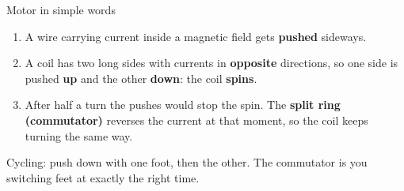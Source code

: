 \documentclass[aspectratio=169,11pt,xcolor=table]{beamer}
\begin{document}
\begin{frame}{Motor in simple words}
\begin{simple}
\begin{enumerate}
\item A wire carrying current inside a magnetic field gets \textbf{pushed} sideways.
\item A coil has two long sides with currents in \textbf{opposite} directions, so one side is pushed \textbf{up} and the other \textbf{down}: the coil \textbf{spins}.
\item After half a turn the pushes would stop the spin. The \textbf{split ring (commutator)} reverses the current at that moment, so the coil keeps turning the same way.
\end{enumerate}
\end{simple}
\begin{examtip}
Cycling: push down with one foot, then the other. The commutator is you switching feet at exactly the right time.
\end{examtip}
\end{frame}
\end{document}
